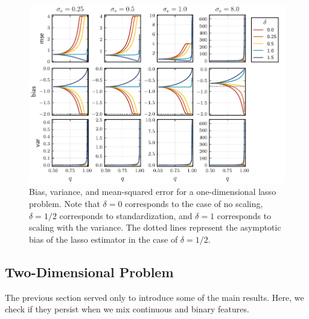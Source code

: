\begin{figure}[htpb]
  \centering
  \includegraphics[]{plots/bias-var-onedim.pdf}
  \caption{%
    Bias, variance, and mean-squared error for a one-dimensional lasso problem.
    Note that \(\delta = 0\) corresponds to the case of no scaling, \(\delta = 1/2\) corresponds
    to standardization, and \(\delta = 1\) corresponds to scaling with the variance. The dotted
    lines represent the asymptotic bias of the lasso estimator in the case of \(\delta = 1/2\).
  }
  \label{fig:bias-var-onedim-lasso}
\end{figure}



\subsection{Two-Dimensional Problem}

The previous section served only to introduce some of the main results. Here, we check if they persist when we mix continuous and binary features.

